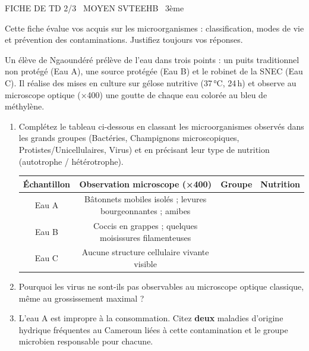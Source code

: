 \documentclass[11pt]{article}
\begin{document}
\begin{tcolorbox}[enhanced,colback=popink,colframe=popink,arc=10pt,boxrule=0pt,left=12pt,right=12pt,top=9pt,bottom=9pt]
{\color{white}\popxbold\small FICHE DE TD 2/3 \textbullet\ MOYEN \hfill SVTEEHB \textbullet\ 3ème\par}
\end{tcolorbox}
\vspace{4pt}
\noindent Cette fiche évalue vos acquis sur les microorganismes : classification, modes de vie et prévention des contaminations. Justifiez toujours vos réponses.

\begin{exercice}
Un élève de Ngaoundéré prélève de l'eau dans trois points : un puits traditionnel non protégé (Eau A), une source protégée (Eau B) et le robinet de la SNEC (Eau C). Il réalise des mises en culture sur gélose nutritive (37\,°C, 24\,h) et observe au microscope optique (×400) une goutte de chaque eau colorée au bleu de méthylène.

\begin{enumerate}
    \item Complétez le tableau ci-dessous en classant les microorganismes observés dans les grands groupes (Bactéries, Champignons microscopiques, Protistes/Unicellulaires, Virus) et en précisant leur type de nutrition (autotrophe / hétérotrophe).
    \begin{tabular}{|c|c|c|c|}
    \hline
    \textbf{Échantillon} & \textbf{Observation microscope (×400)} & \textbf{Groupe} & \textbf{Nutrition} \\
    \hline
    Eau A & Bâtonnets mobiles isolés ; levures bourgeonnantes ; amibes &  &  \\
    \hline
    Eau B & Coccis en grappes ; quelques moisissures filamenteuses &  &  \\
    \hline
    Eau C & Aucune structure cellulaire vivante visible &  &  \\
    \hline
    \end{tabular}
    \item Pourquoi les virus ne sont-ils pas observables au microscope optique classique, même au grossissement maximal ?
    \item L'eau A est impropre à la consommation. Citez \textbf{deux} maladies d'origine hydrique fréquentes au Cameroun liées à cette contamination et le groupe microbien responsable pour chacune.
\end{enumerate}
\end{exercice}
\end{document}
